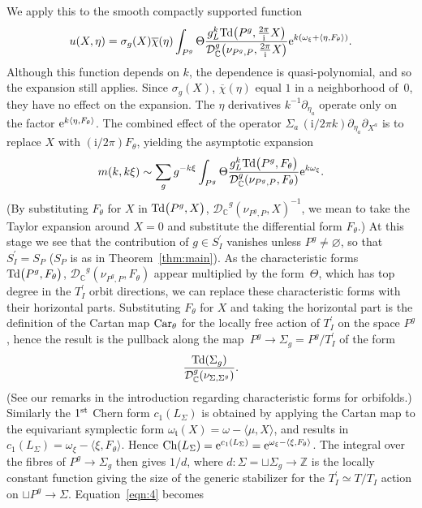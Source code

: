\documentclass[11pt]{article}
\numberwithin{equation}{section}
\newcommand{\pair}[2]{\langle #1, #2 \rangle}
\newcommand{\ol}[1]{\overline{#1}}
\newcommand{\tn}[1]{\textnormal{#1}}
\renewcommand{\i}{{\mathrm{i}}}
\def\t{\ensuremath{\mathfrak{t}}}
\def\bC{\ensuremath{\mathbb{C}}}
\def\bZ{\ensuremath{\mathbb{Z}}}
\def\Ch{\ensuremath{\textnormal{Ch}}}
\def\Td{\ensuremath{\textnormal{Td}}}
\def\calDC{\ensuremath{\mathcal{D}_{\bC}}}
\begin{document}
We apply this to the smooth compactly supported function
\[ u(X,\eta)=\sigma_g(X)\ol{\chi}(\eta) \int_{P^g} \Theta \frac{g_L^k\Td\big(P^g,\tfrac{2\pi}{\i}X\big)}{\calDC^g\big(\nu_{P^g,P},\tfrac{2\pi}{\i}X\big)}{\rm e}^{k(\omega_\xi+\pair{\eta}{F_\theta})}.\]
Although this function depends on $k$, the dependence is quasi-polynomial, and so the expansion still applies. Since $\sigma_g(X)$, $\ol{\chi}(\eta)$ equal $1$ in a neighborhood of~$0$, they have no effect on the expansion. The $\eta$ derivatives $k^{-1}\partial_{\eta_a}$ operate only on the factor ${\rm e}^{k\pair{\eta}{F_\theta}}$. The combined effect of the operator $\Sigma_a\,(\i/2\pi k)\partial_{\eta_a}\partial_{X^a}$ is to replace $X$ with $(\i/2\pi)F_\theta$, yielding the asymptotic expansion
\begin{gather}\label{eqn:4}
m(k,k\xi)\sim \sum_g g^{-k\xi} \int_{P^g} \Theta \frac{g_L^k\Td\big(P^g,F_\theta\big)}{\calDC^g(\nu_{P^g,P},F_\theta)}{\rm e}^{k\omega_\xi}.
\end{gather}
(By substituting $F_\theta$ for $X$ in $\Td\big(P^g,X\big)$, $\calDC^g(\nu_{P^g,P},X)^{-1}$, we mean to take the Taylor expansion around $X=0$ and substitute the differential form $F_\theta$.) At this stage we see that the contribution of $g \in S_I^\prime$ vanishes unless $P^g \ne \varnothing$, so that $S_I^\prime = S_P$ ($S_P$ is as in Theorem~\ref{thm:main}). As the characteristic forms $\Td\big(P^g,F_\theta\big)$, $\calDC^g(\nu_{P^g,P},F_\theta)$ appear multiplied by the form~$\Theta$, which has top degree in the $T_I^\prime$ orbit directions, we can replace these characteristic forms with their horizontal parts. Substituting $F_\theta$ for $X$ and taking the horizontal part is the definition of the Cartan map $\tn{Car}_\theta$ for the locally free action of $T_I^\prime$ on the space $P^g$, hence the result is the pullback along the map~$P^g \rightarrow \Sigma_g=P^g/T_I^\prime$ of the form
\[ \frac{\Td(\Sigma_g)}{\calDC^g(\nu_{\Sigma,\Sigma^g})}. \]
(See our remarks in the introduction regarding characteristic forms for orbifolds.) Similarly the $1^{\rm st}$ Chern form $c_1(L_\Sigma)$ is obtained by applying the Cartan map to the equivariant symplectic form $\omega_\t(X)=\omega-\pair{\mu}{X}$, and results in $c_1(L_\Sigma)=\omega_\xi-\pair{\xi}{F_\theta}$. Hence $\Ch(L_\Sigma)={\rm e}^{c_1(L_\Sigma)}={\rm e}^{\omega_\xi-\pair{\xi}{F_\theta}}$. The integral over the fibres of $P^g \rightarrow \Sigma_g$ then gives $1/d$, where $d \colon \Sigma=\sqcup \Sigma_g \rightarrow \bZ$ is the locally constant function giving the size of the generic stabilizer for the $T_I^\prime \simeq T/T_I$ action on $\sqcup P^g \rightarrow \Sigma$. Equation~\eqref{eqn:4} becomes
\end{document}

